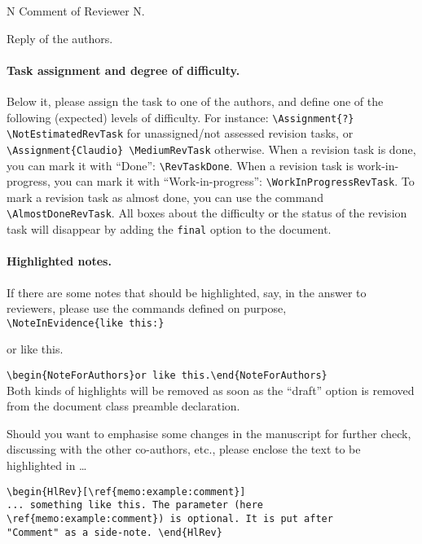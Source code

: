 %
\begin{ReviewerComment}[\label{memo:example:comment}]{N}
Comment of Reviewer N.
\end{ReviewerComment}
%
\begin{Answer}
\begin{sloppypar}
Reply of the authors.
%
%
\paragraph{Task assignment and degree of difficulty.}
Below it, please assign the task to one of the authors, and define one of the following (expected) levels of difficulty.
For instance:
\verb|\Assignment{?} \NotEstimatedRevTask|
for unassigned/not assessed revision tasks, or
\verb|\Assignment{Claudio} \MediumRevTask|
otherwise.
When a revision task is done, you can mark it with ``Done'': \verb|\RevTaskDone|.
When a revision task is work-in-progress, you can mark it with ``Work-in-progress'': \verb|\WorkInProgressRevTask|.
To mark a revision task as almost done, you can use the command \verb|\AlmostDoneRevTask|.
All boxes about the difficulty or the status of the revision task will disappear by adding the \verb|final| option to the document.
%
%
\paragraph{Highlighted notes.}
If there are some notes that should be highlighted, say, in the answer to reviewers, please use the commands defined on purpose,
\\
\verb|\NoteInEvidence{like this:}|
\\
\begin{NoteForAuthors}or like this.\end{NoteForAuthors}
\verb|\begin{NoteForAuthors}or like this.\end{NoteForAuthors}|
\\
Both kinds of highlights will be removed as soon as the ``draft'' option is removed from the document class preamble declaration.
\\
\begin{HlRev}[\ref{memo:example:comment}]
Should you want to emphasise some changes in the manuscript for further check, discussing with the other co-authors, etc., please enclose the text to be highlighted in \ldots
\end{HlRev}
\begin{verbatim}
\begin{HlRev}[\ref{memo:example:comment}]
... something like this. The parameter (here \ref{memo:example:comment}) is optional. It is put after
"Comment" as a side-note. \end{HlRev}
\end{verbatim}
%
%

\end{sloppypar}
\end{Answer}
